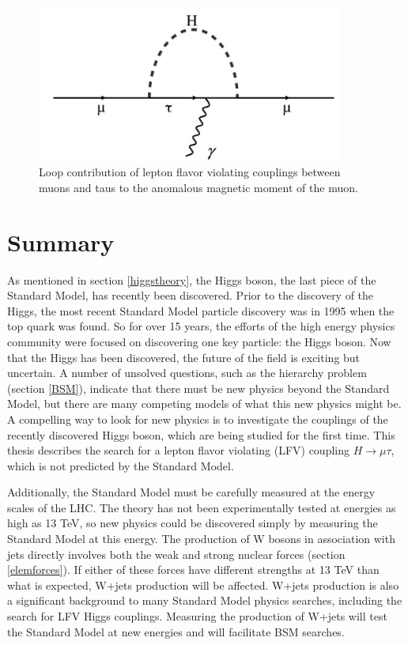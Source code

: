 \documentclass[oneside, letterpaper, oldfontcommands]{memoir}
\begin{document}
\begin{figure}[here]
\includegraphics[width=0.9\textwidth]{mutauloop.jpg}
\caption{Loop contribution of lepton flavor violating couplings between muons and taus to the anomalous magnetic moment of the muon.}
\label{fig:mutauloop}
\end{figure}

\section{Summary}
\qquad As mentioned in section \ref{higgstheory}, the Higgs boson, the last piece of the Standard Model, has recently been discovered. Prior to the discovery of the Higgs, the most recent Standard Model particle discovery was in 1995 when the top quark was found\cite{Agashe:2014kda}. So for over 15 years, the efforts of the high energy physics community were focused on discovering one key particle: the Higgs boson. Now that the Higgs has been discovered, the future of the field is exciting but uncertain. A number of unsolved questions, such as the hierarchy problem (section \ref{BSM}), indicate that there must be new physics beyond the Standard Model, but there are many competing models of what this new physics might be. A compelling way to look for new physics is to investigate the couplings of the recently discovered Higgs boson, which are being studied for the first time. This thesis describes the search for a lepton flavor violating (LFV) coupling $H \rightarrow \mu\tau$, which is not predicted by the Standard Model.

\qquad Additionally, the Standard Model must be carefully measured at the energy scales of the LHC. The theory has not been experimentally tested at energies as high as 13 TeV, so new physics could be discovered simply by measuring the Standard Model at this energy. The production of W bosons in association with jets directly involves both the weak and strong nuclear forces (section \ref{elemforces}). If either of these forces have different strengths at 13 TeV than what is expected, W+jets production will be affected. W+jets production is also a significant background to many Standard Model physics searches, including the search for LFV Higgs couplings. Measuring the production of W+jets will test the Standard Model at new energies and will facilitate BSM searches.  
\end{document}
